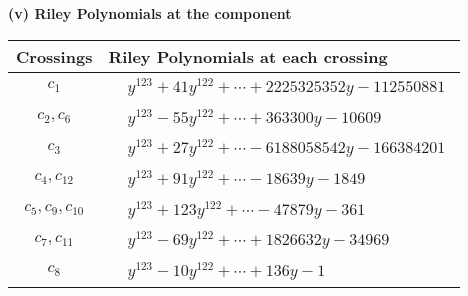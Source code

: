 \documentclass[1p]{elsarticle_modified}
\theoremstyle{definition}
\begin{document}
\flushleft \textbf{(v) Riley Polynomials at the component}\newline \\
\begin{tabular}{m{50pt}|m{274pt}}
Crossings & \hspace{64pt}Riley Polynomials at each crossing \\
\hline $$\begin{aligned}c_{1}\end{aligned}$$&$\begin{aligned}
&y^{123}+41 y^{122}+\cdots+2225325352 y-112550881
\end{aligned}$\\
\hline $$\begin{aligned}c_{2},c_{6}\end{aligned}$$&$\begin{aligned}
&y^{123}-55 y^{122}+\cdots+363300 y-10609
\end{aligned}$\\
\hline $$\begin{aligned}c_{3}\end{aligned}$$&$\begin{aligned}
&y^{123}+27 y^{122}+\cdots-6188058542 y-166384201
\end{aligned}$\\
\hline $$\begin{aligned}c_{4},c_{12}\end{aligned}$$&$\begin{aligned}
&y^{123}+91 y^{122}+\cdots-18639 y-1849
\end{aligned}$\\
\hline $$\begin{aligned}c_{5},c_{9},c_{10}\end{aligned}$$&$\begin{aligned}
&y^{123}+123 y^{122}+\cdots-47879 y-361
\end{aligned}$\\
\hline $$\begin{aligned}c_{7},c_{11}\end{aligned}$$&$\begin{aligned}
&y^{123}-69 y^{122}+\cdots+1826632 y-34969
\end{aligned}$\\
\hline $$\begin{aligned}c_{8}\end{aligned}$$&$\begin{aligned}
&y^{123}-10 y^{122}+\cdots+136 y-1
\end{aligned}$\\
\hline
\end{tabular}\\~\\
\end{document}
